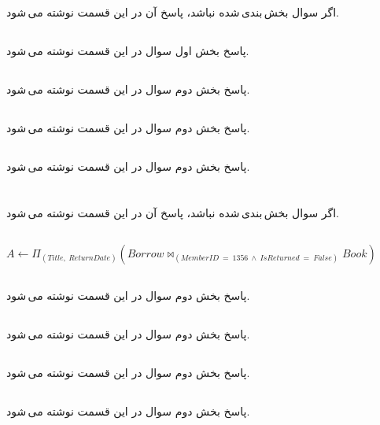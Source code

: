 \documentclass{article}
\begin{document}
\section{}
اگر سوال بخش\,بندی\,شده نباشد، پاسخ آن در این قسمت نوشته می\,شود.
\subsection{}
پاسخ بخش اول سوال در این قسمت نوشته می\,شود.
\subsection{}
پاسخ بخش دوم سوال در این قسمت نوشته می\,شود.
\subsection{}
پاسخ بخش دوم سوال در این قسمت نوشته می\,شود.
\subsection{}
پاسخ بخش دوم سوال در این قسمت نوشته می\,شود.

\section{}
اگر سوال بخش\,بندی\,شده نباشد، پاسخ آن در این قسمت نوشته می\,شود.
\subsection{}

$
A
\leftarrow
\Pi_{(Title,\:ReturnDate)}
(Borrow \bowtie_{(MemberID\:=\:1356\:\wedge\:IsReturned\:=\:False)} Book)
$

\subsection{}
پاسخ بخش دوم سوال در این قسمت نوشته می\,شود.
\subsection{}
پاسخ بخش دوم سوال در این قسمت نوشته می\,شود.
\subsection{}
پاسخ بخش دوم سوال در این قسمت نوشته می\,شود.
\subsection{}
پاسخ بخش دوم سوال در این قسمت نوشته می\,شود.
\end{document}
